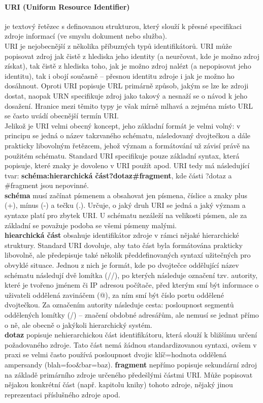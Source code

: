 \documentclass[10pt,a4paper]{article}
\begin{document}
\paragraph{URI (Uniform Resource Identifier)} je textový řetězec s definovanou strukturou, který slouží k přesné specifikaci zdroje informací (ve smyslu dokument nebo služba). \\
URI je nejobecnější z několika příbuzných typů identifikátorů. URI může popisovat zdroj jak čistě z hlediska jeho identity (a neurčovat, kde je možno zdroj získat), tak čistě z hlediska toho, jak je možno zdroj nalézt (a nepopisovat jeho identitu), tak i obojí současně – přesnou identitu zdroje i jak je možno ho dosáhnout. Oproti URI popisuje URL primárně způsob, jakým se lze ke zdroji dostat, naopak URN specifikuje zdroj jako takový a nesnaží se o návod k jeho dosažení. Hranice mezi těmito typy je však mírně mlhavá a zejména místo URL se často uvádí obecnější termín URI. \\
Jelikož je URI velmi obecný koncept, jeho základní formát je velmi volný: v principu se jedná o název takzvaného schématu, následovaný dvojtečkou a dále prakticky libovolným řetězcem, jehož význam a formátování už závisí právě na použitém schématu. Standard URI specifikuje pouze základní syntax, která popisuje, které znaky je dovoleno v URI použít apod. URI tedy má následující tvar: \textbf{schéma:hierarchická část?dotaz\#fragment}, kde části ?dotaz a \#fragment jsou nepovinné. \\
\textbf{schéma} musí začínat písmenem a obsahovat jen písmena, číslice a znaky plus (+), mínus (-) a tečku (.). Určuje, o jaký druh URI se jedná a jaký význam a syntaxe platí pro zbytek URI. U schématu nezáleží na velikosti písmen, ale za základní se považuje podoba se všemi písmeny malými. \\
\textbf{hiearchická část} obsahuje identifikátor zdroje v rámci nějaké hierarchické struktury. Standard URI dovoluje, aby tato část byla formátována prakticky libovolně, ale předepisuje také několik předdefinovaných syntaxí užitečných pro obvyklé situace. Jednou z nich je formát, kde po dvojtečce oddělující název schématu následují dvě lomítka (//), po kterých následuje označení tzv. autority, které je tvořeno jménem či IP adresou počítače, před kterým smí být informace o uživateli oddělená zavináčem (@), za ním smí být číslo portu oddělené dvojtečkou. Za označením autority následuje cesta: posloupnost segmentů oddělených lomítky (/) – značení obdobné adresářům, ale nemusí se jednat přímo o ně, ale obecně o jakýkoli hierarchický systém. \\
\textbf{dotaz} popisuje nehierarchickou část identifikátoru, která slouží k bližšímu určení požadovaného zdroje. Tato část nemá žádnou standardizovanou syntaxi, ovšem v praxi se velmi často používá posloupnost dvojic klíč=hodnota oddělená ampersandy (blah=foo\&bar=baz).
\textbf{fragment} nepřímo popisuje sekundární zdroj na základě primárního zdroje určeného předešlými částmi URI. Může popisovat nějakou konkrétní část (např. kapitolu knihy) tohoto zdroje, nějaký jinou reprezentaci příslušného zdroje apod.
\end{document}
